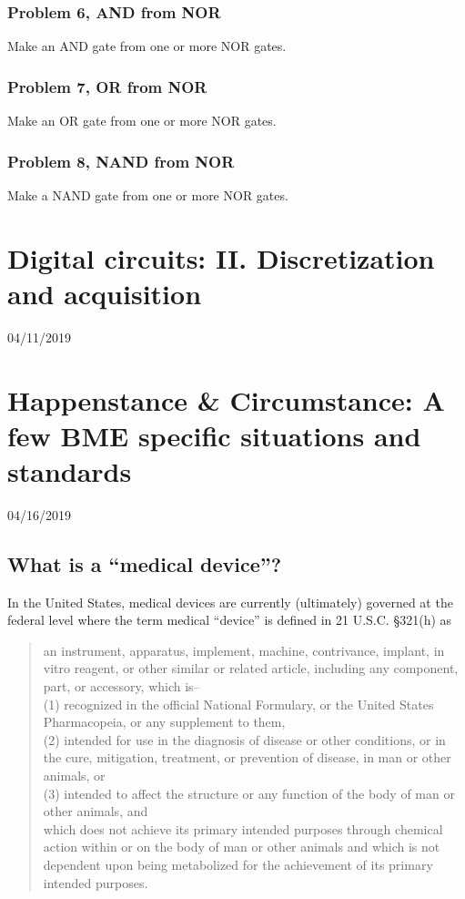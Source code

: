 \documentclass[11pt]{book}
\begin{document}
\subsection{Problem 6, AND from NOR}
Make an AND gate from one or more NOR gates.
\subsection{Problem 7, OR from NOR}
Make an OR gate from one or more NOR gates.
\subsection{Problem 8, NAND from NOR}
Make a NAND gate from one or more NOR gates.





\chapter{Digital circuits: II. Discretization and acquisition}
04/11/2019


\chapter{Happenstance \& Circumstance: A few BME specific situations and standards}
04/16/2019
\minitoc
\newpage

\section{What is a ``medical device''?}
In the United States, medical devices are currently (ultimately) governed at the federal level where the term medical ``device'' is defined in 21 U.S.C. \S 321(h) as

\begin{quote}
	an instrument, apparatus, implement, machine, contrivance, implant, in vitro reagent, or other similar or related article, including any component, part, or accessory, which is--
	\\
	
(1) recognized in the official National Formulary, or the United States Pharmacopeia, or any supplement to them,\\

(2) intended for use in the diagnosis of disease or other conditions, or in the cure, mitigation, treatment, or prevention of disease, in man or other animals, or\\

(3) intended to affect the structure or any function of the body of man or other animals, and \\

which does not achieve its primary intended purposes through chemical action within or on the body of man or other animals and which is not dependent upon being metabolized for the achievement of its primary intended purposes.
\end{quote}
\end{document}
